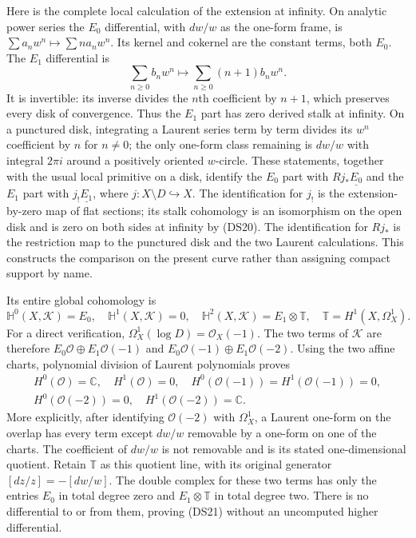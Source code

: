 \documentclass{article}
\begin{document}
Here is the complete local calculation of the extension at infinity.
On analytic power series the $E_0$ differential, with $dw/w$ as the
one-form frame, is
$\sum a_nw^n\mapsto\sum n a_nw^n$.  Its kernel and cokernel are
the constant terms, both $E_0$.  The $E_1$ differential is
\[
 \sum_{n\geq0}b_nw^n\longmapsto
 \sum_{n\geq0}(n+1)b_nw^n.
 \tag{DS20}
\]
It is invertible: its inverse divides the $n$th coefficient by $n+1$,
which preserves every disk of convergence.  Thus the $E_1$ part has
zero derived stalk at infinity.  On a punctured disk, integrating a
Laurent series term by term divides its $w^n$ coefficient by $n$ for
$n\ne0$; the only one-form class remaining is $dw/w$ with integral
$2\pi i$ around a positively oriented $w$-circle.  These statements,
together with the usual local primitive on a disk, identify the
$E_0$ part with $Rj_*\underline{E_0}$ and the $E_1$ part with
$j_!\underline{E_1}$, where $j:X\setminus D\hookrightarrow X$.
The identification for $j_!$ is the extension-by-zero map of flat
sections; its stalk cohomology is an isomorphism on the open disk and
is zero on both sides at infinity by (DS20).  The identification for
$Rj_*$ is the restriction map to the punctured disk and the two
Laurent calculations.  This constructs the comparison on the present
curve rather than assigning compact support by name.

Its entire global cohomology is
\[
 \mathbb H^0(X,\mathscr K)=E_0,\quad
 \mathbb H^1(X,\mathscr K)=0,\quad
 \mathbb H^2(X,\mathscr K)=E_1\otimes\mathbb T,
 \quad\mathbb T=H^1(X,\Omega_X^1).
 \tag{DS21}
\]
For a direct verification, $\Omega_X^1(\log D)=\mathcal O_X(-1)$.
The two terms of $\mathscr K$ are therefore
$E_0\mathcal O\oplus E_1\mathcal O(-1)$ and
$E_0\mathcal O(-1)\oplus E_1\mathcal O(-2)$.
Using the two affine charts, polynomial division of Laurent
polynomials proves
\[
 \begin{gathered}
 H^0(\mathcal O)=\mathbb C,\quad H^1(\mathcal O)=0,
 \quad H^0(\mathcal O(-1))=H^1(\mathcal O(-1))=0,\\
 H^0(\mathcal O(-2))=0,\quad H^1(\mathcal O(-2))=\mathbb C.
 \end{gathered}
 \tag{DS22}
\]
More explicitly, after identifying $\mathcal O(-2)$ with
$\Omega_X^1$, a Laurent one-form on the overlap has every term
except $dw/w$ removable by a one-form on one of the charts.
The coefficient of $dw/w$ is not removable and is its stated
one-dimensional quotient. Retain $\mathbb T$ as this quotient line, with
its original generator $[dz/z]=-[dw/w]$.  The double complex for these two terms
has only the entries $E_0$ in total degree zero and $E_1\otimes\mathbb T$ in total
degree two.  There is no differential to or from them, proving
(DS21) without an uncomputed higher differential.
\end{document}
